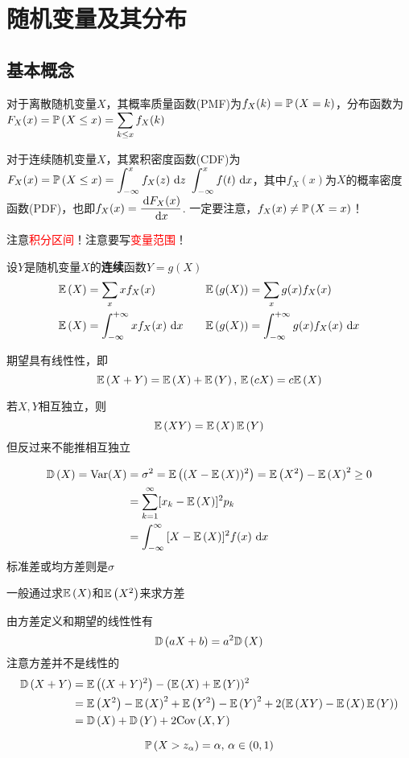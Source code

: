 
\section{随机变量及其分布}
\subsection{基本概念}
\begin{definition}
对于离散随机变量$X$，其概率质量函数(PMF)为$f_X(k)=\pr{X=k}$，分布函数为$\disp F_X(x)=\pr{X\leq x}=\sum_{k\leq x}f_X(k)$
\end{definition}
\begin{definition}
对于连续随机变量$X$，其累积密度函数(CDF)为$F_X(x)=\pr{X\leq x}=\intabu{-\infty}{x}{f_X(z)}{z}$
$\displaystyle \intab{-\infty}{x}{f(t)}$，其中$f_X(x)$为$X$的概率密度函数(PDF)，也即$f_X(x)=\dfrac{\diff F_X(x)}{\diff x}$.
一定要注意，$f_X(x)\ne\pr{X=x}$！
\end{definition}
注意\textcolor{red}{积分区间}！注意要写\textcolor{red}{变量范围}！
\begin{definition}[期望]
设$Y$是随机变量$X$的\textbf{连续}函数$Y=g(X)$
\[\begin{aligned}
\E{X}&=\sum_x xf_X(x) \quad& \E{g(X)}&=\sum_x g(x)f_X(x)\\
\E{X}&=\intab{-\infty}{+\infty}{xf_X(x)} \quad& \E{g(X)}&=\intab{-\infty}{+\infty}{g(x)f_X(x)}
\end{aligned}\]
\end{definition}
\par 期望具有线性性，即
\[\E{X+Y}=\E{X}+\E{Y},\,\E{cX}=c\E{X}\]
\par 若$X,Y$相互独立，则
\[\E{XY}=\E{X}\E{Y}\]
但反过来不能推相互独立
\begin{definition}[方差]
\[\begin{aligned}
\Var{X}=\mathrm{Var}(X)&=\sigma^2=\E{(X-\E{X})^2}=\E{X^2}-\E{X}^2\geq 0\\
&=\sum_{k=1}^\infty[x_k-\E{X}]^2p_k\\
&=\intab{-\infty}{\infty}{[X-\E{X}]^2f(x)}
\end{aligned}\]
标准差或均方差则是$\sigma$
\end{definition}
一般通过求$\E{X}$和$\E{X^2}$来求方差\par
由方差定义和期望的线性性有
\[\Var{aX+b}=a^2\Var{X}\]
注意方差并不是线性的
\[\begin{aligned}
\Var{X+Y}&=\E{(X+Y)^2}-(\E{X}+\E{Y})^2\\
&=\E{X^2}-\E{X}^2+\E{Y^2}-\E{Y}^2+2(\E{XY}-\E{X}\E{Y})\\
&=\Var{X}+\Var{Y}+2\Cov{X,Y}
\end{aligned}\]
\begin{definition}
\[\pr{X>z_\alpha}=\alpha,\,\alpha\in(0,1)\]
\end{definition}

